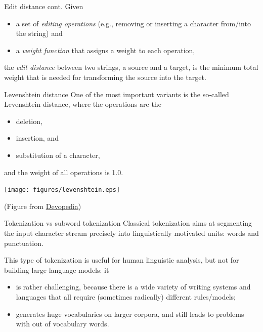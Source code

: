 \documentclass[style=upen, size=14pt]{powerdot}
\newcommand{\gold}{\color{arany}}
\theoremstyle{definition}
\begin{document}
\begin{slide}[toc=]{Edit distance cont.}
  Given
  \begin{itemize}
  \item a set of \emph{\gold editing operations} (e.g., removing or inserting a character
    from/into the string) and
  \item a \emph{\gold weight function} that assigns a weight to each operation,
  \end{itemize}
  the \emph{\gold edit distance} between two strings, a source and a target, is
  the minimum total weight that is needed for transforming the source into the
  target.
\end{slide}
    
\begin{slide}[toc=]{Levenshtein distance}
  One of the most important variants is the so-called Levenshtein distance,
  where the operations are the
   \begin{itemize}
  \item deletion,
  \item insertion, and
  \item substitution of a character,
  \end{itemize}
  and the weight of all operations is 1.0.
  \begin{center}
    \texttt{[image: figures/levenshtein.eps]}\
    
    \footnotesize{(Figure from \href{https://devopedia.org/levenshtein-distance}{Devopedia})}
  \end{center}
\end{slide}


\begin{slide}[toc=Subword tokenization]{Tokenization vs subword tokenization}
  Classical tokenization aims at segmenting the input character stream precisely
  into linguistically motivated units: words and punctuation.

  This type of
  tokenization is useful for human linguistic analysis, but not for building
  large language models: it

  \begin{itemize}
  \item is rather challenging, because there is a wide variety of writing systems
    and languages that all require (sometimes radically) different rules/models;
  \item generates huge vocabularies on larger corpora, and still leads to
    problems with out of vocabulary words.
  \end{itemize}
\end{slide}
\end{document}
